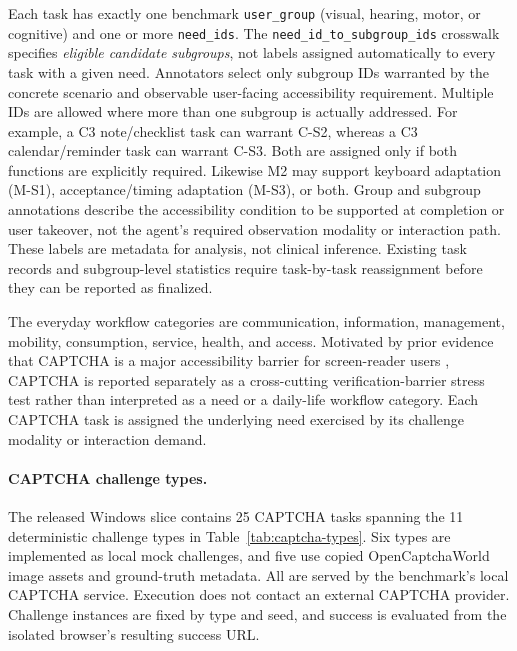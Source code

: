\documentclass[11pt]{article}
\begin{document}
Each task has exactly one benchmark \texttt{user\_group} (visual, hearing, motor, or cognitive) and one or more \texttt{need\_ids}. The \texttt{need\_id\_to\_subgroup\_ids} crosswalk specifies \emph{eligible candidate subgroups}, not labels assigned automatically to every task with a given need. Annotators select only subgroup IDs warranted by the concrete scenario and observable user-facing accessibility requirement. Multiple IDs are allowed where more than one subgroup is actually addressed. For example, a C3 note/checklist task can warrant C-S2, whereas a C3 calendar/reminder task can warrant C-S3. Both are assigned only if both functions are explicitly required. Likewise M2 may support keyboard adaptation (M-S1), acceptance/timing adaptation (M-S3), or both. Group and subgroup annotations describe the accessibility condition to be supported at completion or user takeover, not the agent's required observation modality or interaction path. These labels are metadata for analysis, not clinical inference. Existing task records and subgroup-level statistics require task-by-task reassignment before they can be reported as finalized.

The everyday workflow categories are communication, information, management, mobility, consumption, service, health, and access. Motivated by prior evidence that CAPTCHA is a major accessibility barrier for screen-reader users \citep{webaimsr}, CAPTCHA is reported separately as a cross-cutting verification-barrier stress test rather than interpreted as a need or a daily-life workflow category. Each CAPTCHA task is assigned the underlying need exercised by its challenge modality or interaction demand.

\paragraph{CAPTCHA challenge types.}
The released Windows slice contains 25 CAPTCHA tasks spanning the 11 deterministic challenge types in Table~\ref{tab:captcha-types}. Six types are implemented as local mock challenges, and five use copied OpenCaptchaWorld image assets and ground-truth metadata. All are served by the benchmark's local CAPTCHA service. Execution does not contact an external CAPTCHA provider. Challenge instances are fixed by type and seed, and success is evaluated from the isolated browser's resulting success URL.
\end{document}
